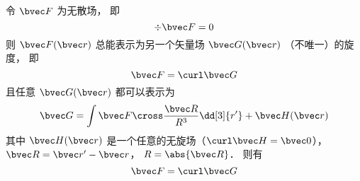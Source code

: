 
令 $\bvec F$ 为无散场， 即
\begin{equation}
\div \bvec F = 0
\end{equation}
则 $\bvec F(\bvec r)$ 总能表示为另一个矢量场 $\bvec G(\bvec r)$ （不唯一）的旋度， 即
\begin{equation}
\bvec F = \curl \bvec G
\end{equation}
且任意 $\bvec G(\bvec r)$ 都可以表示为
\begin{equation}
\bvec G = \int \bvec F \cross \frac{\bvec R}{R^3} \dd[3]{r'} + \bvec H(\bvec r)
\end{equation}
其中 $\bvec H(\bvec r)$ 是一个任意的无旋场（$\curl \bvec H = \bvec 0$）， $\bvec R = \bvec r' - \bvec r$， $R = \abs{\bvec R}$． 则有
\begin{equation}
\bvec F = \curl \bvec G
\end{equation}
